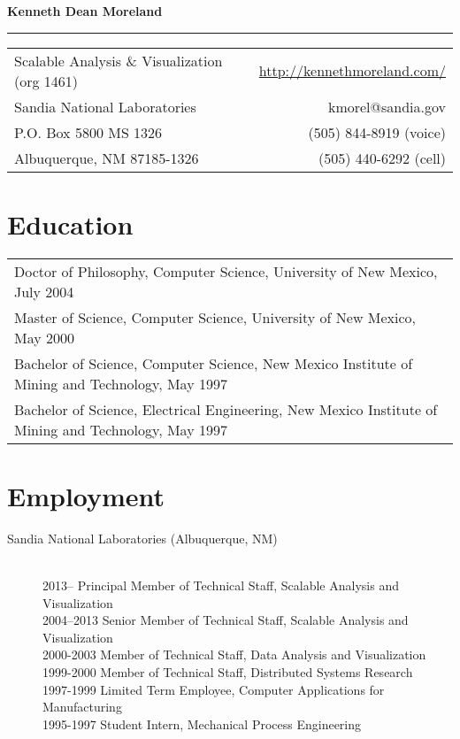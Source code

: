 \documentclass{article}
\date{February  1, 2021}
\begin{document}
\begin{center}
  \textbf{\LARGE Kenneth Dean Moreland}
\end{center}

\rule{\textwidth}{1mm}

\begin{center}
  \begin{tabular*}{\textwidth}{@{\extracolsep{\fill}}lr}
    Scalable Analysis \& Visualization (org 1461) & \url{http://kennethmoreland.com/} \\
    Sandia National Laboratories                  & kmorel@sandia.gov \\
    P.O. Box 5800 MS 1326                         & (505) 844-8919 (voice) \\
    Albuquerque, NM 87185-1326                    & (505) 440-6292 (cell) \\
  \end{tabular*}
\end{center}

\begin{center}
  {\large
    \makeatletter
    \@date
    \makeatother
  }
\end{center}


\section*{Education}

\begin{tabular}{l}
  Doctor of Philosophy, Computer Science, University of New Mexico, July 2004 \\
  Master of Science, Computer Science, University of New Mexico, May 2000 \\
  Bachelor of Science, Computer Science, New Mexico Institute of Mining and Technology, May 1997 \\
  Bachelor of Science, Electrical Engineering, New Mexico Institute of Mining and Technology, May 1997 \\
\end{tabular}


\section*{Employment}

\begin{description}
\item[Sandia National Laboratories (Albuquerque, NM)]\hfill\\
  2013-- Principal Member of Technical Staff, Scalable Analysis and Visualization\\
  2004--2013 Senior Member of Technical Staff, Scalable Analysis and Visualization\\
  2000-2003 Member of Technical Staff, Data Analysis and Visualization\\
  1999-2000 Member of Technical Staff, Distributed Systems Research\\
  1997-1999 Limited Term Employee, Computer Applications for Manufacturing\\
  1995-1997 Student Intern, Mechanical Process Engineering
\end{description}
\end{document}
